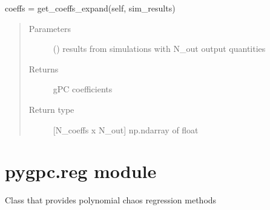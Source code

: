 \documentclass[letterpaper,10pt,english,openany,oneside]{sphinxmanual}
\begin{document}
\begin{fulllineitems}
\begin{fulllineitems}
coeffs = get\_coeffs\_expand(self, sim\_results)
\begin{quote}\begin{description}
\item[{Parameters}] \leavevmode
{} (\sphinxstyleliteralemphasis{\sphinxupquote{{[}}}\sphinxstyleliteralemphasis{\sphinxupquote{{]} }}) \textendash{} results from simulations with N\_out output quantities

\item[{Returns}] \leavevmode
{} \textendash{} gPC coefficients

\item[{Return type}] \leavevmode
{[}N\_coeffs x N\_out{]} np.ndarray of float

\end{description}\end{quote}

\end{fulllineitems}


\end{fulllineitems}



\section{pygpc.reg module}
\label{\detokenize{pygpc:module-pygpc.reg}}\label{\detokenize{pygpc:pygpc-reg-module}}
Class that provides polynomial chaos regression methods
\end{document}
